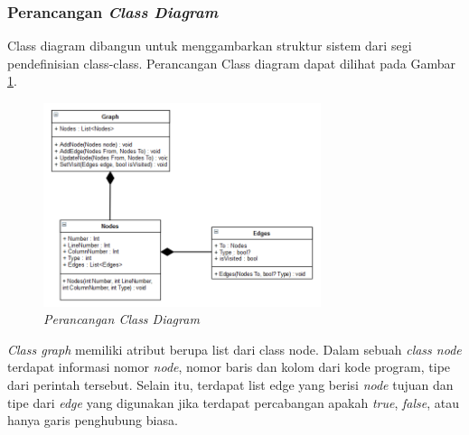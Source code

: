 \subsubsection*{Perancangan \textit{Class Diagram}}
Class diagram dibangun untuk menggambarkan struktur sistem dari segi pendefinisian class-class. Perancangan Class diagram dapat dilihat pada Gambar \ref{fig:classdiagram}.
\begin{figure}[h!]
	\centering
	\includegraphics[width=230pt]{gambar/classdiagram}
	\caption{\textit{Perancangan \textit{Class Diagram}}}
	\label{fig:classdiagram}
\end{figure}
\textit{Class graph} memiliki atribut berupa list dari class node. Dalam sebuah \textit{class node} terdapat informasi nomor \textit{node}, nomor baris dan kolom dari kode program, tipe dari perintah tersebut. Selain itu, terdapat list edge yang berisi \textit{node} tujuan dan tipe dari \textit{edge} yang digunakan jika terdapat percabangan apakah \textit{true}, \textit{false}, atau hanya garis penghubung biasa.
